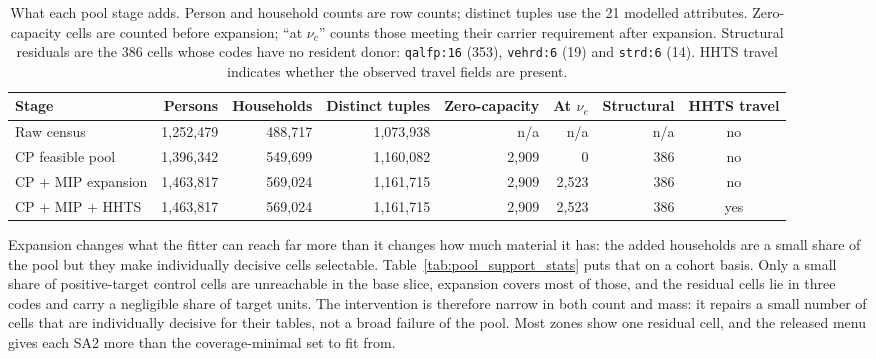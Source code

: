 \documentclass[review]{elsarticle}
\begin{document}
\begin{table}[h!]
\centering
\caption{What each pool stage adds. Person and household counts are row counts;
distinct tuples use the 21 modelled attributes. Zero-capacity cells are counted
before expansion; ``at \(\nu_c\)'' counts those meeting their carrier requirement
after expansion. Structural residuals are the 386 cells whose codes have no
resident donor: \texttt{qalfp:16} (353), \texttt{vehrd:6} (19) and
\texttt{strd:6} (14). HHTS travel indicates whether the observed travel fields
are present.}
\label{tab:pool_growth}
\footnotesize
\setlength{\tabcolsep}{4pt}
\begin{tabular}{@{}lrrrrrrc@{}}
\toprule
Stage & Persons & Households & Distinct tuples & Zero-capacity & At \(\nu_c\) & Structural & HHTS travel \\
\midrule
Raw census        & 1{,}252{,}479 & 488{,}717 & 1{,}073{,}938 & n/a & n/a & n/a & no \\
CP feasible pool  & 1{,}396{,}342 & 549{,}699 & 1{,}160{,}082 & 2{,}909 & 0 & 386 & no \\
CP + MIP expansion & 1{,}463{,}817 & 569{,}024 & 1{,}161{,}715 & 2{,}909 & 2{,}523 & 386 & no \\
CP + MIP + HHTS   & 1{,}463{,}817 & 569{,}024 & 1{,}161{,}715 & 2{,}909 & 2{,}523 & 386 & yes \\
\bottomrule
\end{tabular}
\end{table}

Expansion changes what the fitter can reach far more than it changes how much
material it has: the added households are a small share of the pool but they
make individually decisive cells selectable. Table~\ref{tab:pool_support_stats}
puts that on a cohort basis.
Only a small share of positive-target control cells are unreachable in the base
slice, expansion covers most of those, and the residual cells lie in three codes
and carry a negligible share of target units. The intervention is therefore
narrow in both count and mass: it repairs a small number of cells that are
individually decisive for their tables, not a broad failure of the pool. Most
zones show one residual cell, and the released menu gives each SA2 more than the
coverage-minimal set to fit from.
\end{document}
